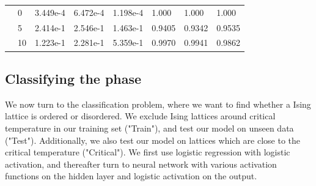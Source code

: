 \begin{table} [H]
\begin{tabularx}{\textwidth}{l|l|XXX|XXX}
		\parbox[t]{2mm}{}
		&0 & 3.449e-4 & 6.472e-4 & 1.198e-4 & 1.000 & 1.000 & 1.000\\
		&5 & 2.414e-1 & 2.546e-1 & 1.463e-1 & 0.9405 & 0.9342 & 0.9535\\
		&10 & 1.223e-1 & 2.281e-1 & 5.359e-1 & 0.9970 & 0.9941 & 0.9862\\ \hline\hline
	\end{tabularx}
\end{table}


\subsection{Classifying the phase}
We now turn to the classification problem, where we want to find whether a Ising lattice is ordered or disordered. We exclude Ising lattices around critical temperature in our training set ("Train"), and test our model on unseen data ("Test"). Additionally, we also test our model on lattices which are close to the critical temperature ("Critical"). We first use logistic regression with logistic activation, and thereafter turn to neural network with various activation functions on the hidden layer and logistic activation on the output. 


